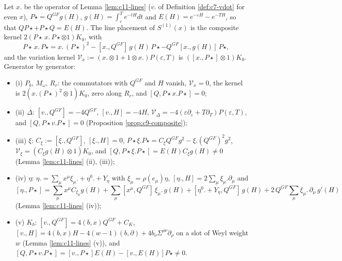 \begin{proposition}
\label{prop:c12-composite}
Let $x.$ be the operator of Lemma \ref{lem:c11-lines} ($v.$ of Definition \ref{def:c7-vdot} for even $x$), $P\star=Q^{GF}g(H)$, $g(H)=\int_\varepsilon^Te^{-tH}dt$ and $E(H)=e^{-\varepsilon H}-e^{-TH}$, so that $QP\star+P\star Q=E(H)$. The line placement of $S^{(1)}(x)$ is the composite kernel $2(P\star\,x.\,P\star\otimes1)K_0$, with
\begin{equation}
P\star\,x.\,P\star=x.\,(P\star)^2-[x.,Q^{GF}]\,g(H)\,P\star-Q^{GF}[x.,g(H)]\,P\star ,
\label{eq:c12-line}
\end{equation}
and the variation kernel $\mathcal V_x:=(x.\otimes1+1\otimes x.)P(\varepsilon,T)$ is $([x.,P\star]\otimes1)K_0$. Generator by generator:
\begin{itemize}
\item (i) $P_b$, $M_\omega$, $R_r$: the commutators with $Q^{GF}$ and $H$ vanish, $\mathcal V_x=0$, the kernel is $2(x.(P\star)^2\otimes1)K_0$, zero along $R_r$, and $[Q,P\star x.P\star]=0$;
\item (ii) $\Delta$: $[v.,Q^{GF}]=-4Q^{GF}$, $[v.,H]=-4H$, $\mathcal V_\Delta=-4(\varepsilon\partial_\varepsilon+T\partial_T)P(\varepsilon,T)$, and $[Q,P\star v.P\star]=0$ (Proposition \ref{prop:c9-composite});
\item (iii) $\xi$: $C_\xi:=[\xi.,Q^{GF}]$, $[\xi.,H]=0$, $P\star\xi.P\star=C_\xi Q^{GF}g^2-\xi.(Q^{GF})^2g^2$, $\mathcal V_\xi=(C_\xi g(H)\otimes1)K_0$, and $[Q,P\star\xi.P\star]=E(H)C_\xi g(H)\neq0$ (Lemma \ref{lem:c11-lines} (ii), (iii));
\item (iv) $\eta$: $\eta.=\sum_\mu x^\mu\xi_\mu.+\eta^0.+Y_\eta$ with $\xi_\mu=\rho(e_\mu)\eta$, $[\eta.,H]=2\sum_\mu\xi_\mu.\partial_\mu$ and
\[
[\eta.,P\star]=\sum_\mu x^\mu C_{\xi_\mu}g(H)+\sum_\mu[x^\mu,Q^{GF}]\,\xi_\mu.\,g(H)+[\eta^0.+Y_\eta,Q^{GF}]\,g(H)+2\,Q^{GF}\sum_\mu\xi_\mu.\,\partial_\mu\,g'(H)
\]
(Lemma \ref{lem:c11-lines} (iv));
\item (v) $K_b$: $[v.,Q^{GF}]=4(b,x)Q^{GF}+C_K$, $[v.,H]=4(b,x)H-4(w-1)(b,\partial)+4b_\nu\Sigma^{\rho\nu}\partial_\rho$ on a slot of Weyl weight $w$ (Lemma \ref{lem:c11-lines} (v)), and $[Q,P\star v.P\star]=[v.,P\star]E(H)-[v.,E(H)]P\star\neq0$.
\end{itemize}
\end{proposition}

